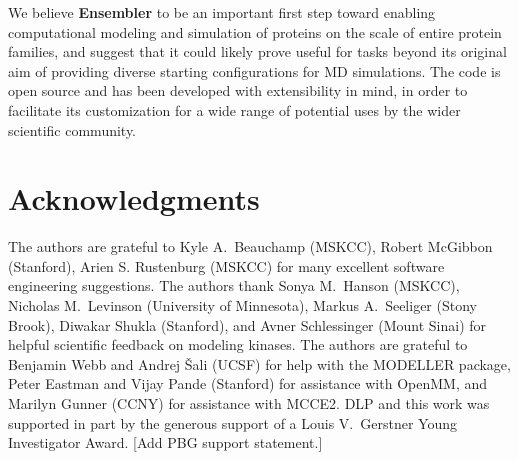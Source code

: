 \documentclass[aps,pre,twocolumn,nofootinbib,superscriptaddress,linenumbers]{revtex4-1}
\begin{document}
We believe {\bf Ensembler} to be an important first step toward enabling computational modeling and simulation of proteins on the scale of entire protein families, and suggest that it could likely prove useful for tasks beyond its original aim of providing diverse starting configurations for MD simulations.
The code is open source and has been developed with extensibility in mind, in order to facilitate its customization for a wide range of potential uses by the wider scientific community.





\section{Acknowledgments}
\label{section:acknowledgments}

The authors are grateful to Kyle A.~Beauchamp (MSKCC), Robert McGibbon (Stanford), Arien S. Rustenburg (MSKCC) for many excellent software engineering suggestions.
The authors thank Sonya M.~Hanson (MSKCC), Nicholas M.~Levinson (University of Minnesota), Markus A.~Seeliger (Stony Brook), Diwakar Shukla (Stanford), and Avner Schlessinger (Mount Sinai) for helpful scientific feedback on modeling kinases.
The authors are grateful to Benjamin Webb and Andrej \v{S}ali (UCSF) for help with the MODELLER package, Peter Eastman and Vijay Pande (Stanford) for assistance with OpenMM, and Marilyn Gunner (CCNY) for assistance with MCCE2.
DLP and this work was supported in part by the generous support of a Louis V.~Gerstner Young Investigator Award.
{\color{red}[Add PBG support statement.]}


% 

\end{document}
